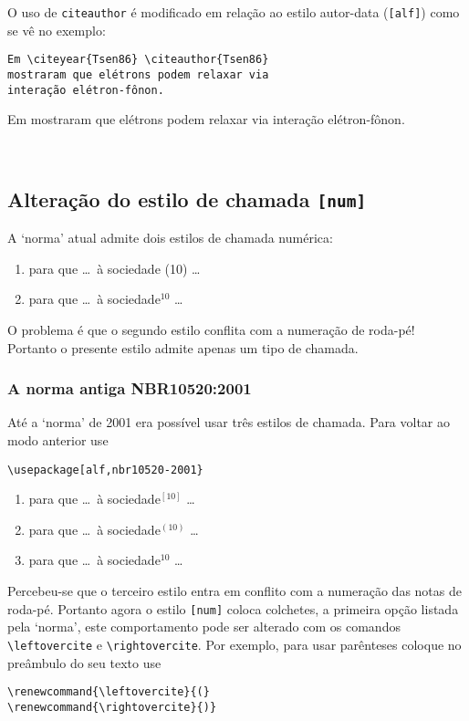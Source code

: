 \documentclass[espacosimples]{abnt}
\begin{document}
O uso de \verb+citeauthor+ é modificado em relação ao estilo autor-data ({\tt [alf]})
como se vê no exemplo:

\noindent\begin{minipage}[t]{10cm}\small\begin{verbatim}
Em \citeyear{Tsen86} \citeauthor{Tsen86}
mostraram que elétrons podem relaxar via 
interação elétron-fônon.
\end{verbatim}\end{minipage}\begin{minipage}[t]{7cm}\small
Em \citeyear{Tsen86} \citeauthor{Tsen86}
mostraram que elétrons podem relaxar via
interação elétron-fônon.
\end{minipage}\vspace{5mm}\\

\subsection{Alteração do estilo de chamada {\tt [num]}}

A `norma' atual \cite{NBR10520:2002} admite dois estilos de chamada numérica:
\begin{enumerate}
\item para que \ldots\ à sociedade (10) \ldots\
\item para que \ldots\ à sociedade$^{10}$ \ldots\
\end{enumerate}
O problema é que o segundo estilo conflita com a numeração de roda-pé!
Portanto o presente estilo admite apenas um tipo de chamada.

\subsubsection{A norma antiga NBR10520:2001}

Até a `norma' de 2001 \cite{NBR10520:2001} era possível usar três estilos de chamada.
Para voltar ao modo anterior use
\begin{verbatim}
\usepackage[alf,nbr10520-2001}
\end{verbatim}
\begin{enumerate}
\item para que \ldots\ à sociedade$^{[10]}$ \ldots\
\item para que \ldots\ à sociedade$^{(10)}$ \ldots\
\item para que \ldots\ à sociedade$^{10}$ \ldots\
\end{enumerate}
Percebeu-se que o terceiro estilo entra em conflito com a
numeração das notas de roda-pé.
Portanto agora o estilo {\tt [num]} coloca colchetes, a primeira
opção listada pela `norma'\cite{NBR10520:2001}, este comportamento
pode ser alterado com os comandos \verb+\leftovercite+ e
\verb+\rightovercite+.
Por exemplo, para usar parênteses coloque no preâmbulo do seu texto use
\begin{verbatim}
\renewcommand{\leftovercite}{(}
\renewcommand{\rightovercite}{)}
\end{verbatim}
\end{document}
